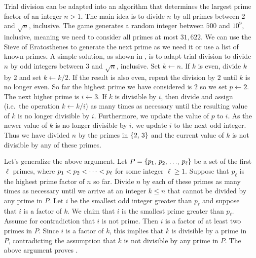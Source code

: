 \begin{algorithm}[!htbp]

\caption{%
  The largest prime factor of an integer.
}
\label{alg:prime:max_prime_factor}
\end{algorithm}

Trial division can be adapted into an algorithm that determines the
largest prime factor of an integer $n > 1$.  The main idea is to
divide $n$ by all primes between $2$ and $\sqrt{n}$, inclusive.  The
game generates a random integer between $500$ and $10^9$, inclusive,
meaning we need to consider all primes at most $31,622$.  We can use
the Sieve of Eratosthenes to generate the next prime as we need it or
use a list of known primes.  A simple solution, as shown in
, is to adapt trial division to
divide $n$ by odd integers between $3$ and $\sqrt{n}$, inclusive.  Set
$k \gets n$.  If $k$ is even, divide $k$ by $2$ and set
$k \gets k / 2$.  If the result is also even, repeat the division by
$2$ until $k$ is no longer even.  So far the highest prime we have
considered is $2$ so we set $p \gets 2$.  The next higher prime is
$i \gets 3$.  If $k$ is divisible by $i$, then divide and assign
(i.e.~the operation $k \gets k / i$) as many times as necessary until
the resulting value of $k$ is no longer divisible by $i$.
Furthermore, we update the value of $p$ to $i$.  As the newer value of
$k$ is no longer divisible by $i$, we update $i$ to the next odd
integer.  Thus we have divided $n$ by the primes in
$\left\{{2},\, {3}\right\}$ and the current value of $k$ is not divisible by
any of these primes.

Let's generalize the above argument.  Let
$P = \left\{ {{p}_1},\, {{p}_2},\, {\dots},\, {{p}_{\ell}} \right\}$ be a set of the first $\ell$ primes,
where ${p}_1 < {p}_2 < \cdots < {p}_{\ell}$ for some integer $\ell \geq 1$.  Suppose that
$p_{\ell}$ is the highest prime factor of $n$ so far.  Divide $n$ by
each of these primes as many times as necessary until we arrive at an
integer $k \leq n$ that cannot be divided by any prime in $P$.  Let
$i$ be the smallest odd integer greater than $p_{\ell}$ and suppose
that $i$ is a factor of $k$.  We claim that $i$ is the smallest prime
greater than
$p_{\ell}$.  Assume for contradiction that $i$ is not prime.  Then $i$
is a factor of at least two primes in $P$.  Since $i$ is a factor of
$k$, this implies that $k$ is divisible by a prime in $P$,
contradicting the assumption that $k$ is not divisible by any prime in
$P$.  The above argument proves
.

